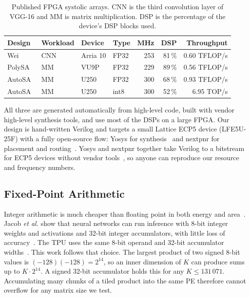 \begin{table}[t]
\centering
\caption{Published FPGA systolic arrays. CNN is the third convolution layer of VGG-16 and MM is matrix multiplication. DSP is the percentage of the device's DSP blocks used.}
\label{tab:fpgacompare}
\footnotesize
\setlength{\tabcolsep}{3pt}
\begin{tabular}{@{}llllrrr@{}}
\toprule
Design & Workload & Device & Type & MHz & DSP & Throughput \\
\midrule
Wei~\cite{wei2017automated} & CNN & Arria 10 & FP32 & 253 & 81\,\% & 0.60 TFLOP/s \\
PolySA~\cite{cong2018polysa} & MM & VU9P & FP32 & 229 & 89\,\% & 0.56 TFLOP/s \\
AutoSA~\cite{wang2021autosa} & MM & U250 & FP32 & 300 & 68\,\% & 0.93 TFLOP/s \\
AutoSA~\cite{wang2021autosa} & MM & U250 & int8 & 300 & 52\,\% & 6.95 TOP/s \\
\bottomrule
\end{tabular}
\end{table}

All three are generated automatically from high-level code, built with vendor high-level synthesis tools, and use most of the DSPs on a large FPGA. Our design is hand-written Verilog and targets a small Lattice ECP5 device (LFE5U-25F) with a fully open-source flow: Yosys for synthesis~\cite{wolf2013yosys} and nextpnr for placement and routing~\cite{shah2019yosysnextpnr}. Yosys and nextpnr together take Verilog to a bitstream for ECP5 devices without vendor tools~\cite{shah2019yosysnextpnr}, so anyone can reproduce our resource and frequency numbers.

\subsection{Fixed-Point Arithmetic}
Integer arithmetic is much cheaper than floating point in both energy and area~\cite{horowitz2014energy}. Jacob \emph{et al.} show that neural networks can run inference with 8-bit integer weights and activations and 32-bit integer accumulators, with little loss of accuracy~\cite{jacob2018quantization}. The TPU uses the same 8-bit operand and 32-bit accumulator widths~\cite{jouppi2017tpu}. This work follows that choice. The largest product of two signed 8-bit values is $(-128)(-128) = 2^{14}$, so an inner dimension of $K$ can produce sums up to $K \cdot 2^{14}$. A signed 32-bit accumulator holds this for any $K \le 131\,071$. Accumulating many chunks of a tiled product into the same PE therefore cannot overflow for any matrix size we test.

